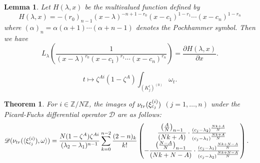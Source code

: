\documentclass[10pt,a4paper]{amsart}
\newtheorem{lem}{Lemma}
\newtheorem{thm}{Theorem}
\newcommand{\Z}{\mathbb{Z}}
\renewcommand{\l}{\lambda}
\begin{document}
\begin{lem} \label{potential}
Let $H(\l,x)$ be the multivalued function defined by
$$H(\l, x)= -(r_0)_{n-1} (x-\l)^{-n+1-r_0} (x-c_1)^{1-r_1} \cdots (x-c_n)^{1-r_n}$$
where $(\alpha)_n = \alpha(\alpha+1)\cdots (\alpha+n-1)$ denotes the Pochhammer symbol. 
Then we have 
$$L_\l\left(\dfrac1{(x-\l)^{r_0}(x-c_1)^{r_1} \cdots (x-c_n)^{r_n}}\right)= \dfrac{\partial H(\l,x)}{\partial x}. $$
\end{lem}

\begin{equation}\label{afterpair}
t\mapsto \zeta^{Ai}(1-\zeta^A)\int_{(K_j^l)^{(0)}}\omega_t.
\end{equation}

\begin{thm} \label{main:1}
For $i \in \Z/N\Z$, the images of $\nu_{\rm tr}(\xi_{c_j}^{(i)})$ $(j=1, \ldots, n)$ under the Picard-Fuchs differential operator $\mathscr{D}$ are as follows: 
\begin{align*}
&\mathscr{D}(\nu_{\rm tr}(\langle \xi_{c_j}^{(i)}), \omega \rangle)= 
\frac{N(1-\zeta^A)\zeta^{Ai}}{(\l_2-\l_1)^{n-1}}
\sum_{k=0}^{n-2}
\dfrac{(2-n)_k}{k!}
\begin{pmatrix}
  \dfrac{\left(\frac{A}{N} \right)_{n-1}}{(Nk+A)} \cdot
 \frac{(c_j-\l_2)^{\frac{Nk+A}{N}}}{(c_j-\l_1)^{\frac{Nk+A}{N}}}\\
- 
  \dfrac{\left(\frac{N-A}N\right)_{n-1}}{(Nk+N-A)} \cdot \frac{(c_j-\l_1)^{\frac{Nk+N-A}{N}}}{(c_j-\l_2)^{\frac{Nk+N-A}{N}}}
\end{pmatrix}. 
\end{align*}
\end{thm}
\end{document}

